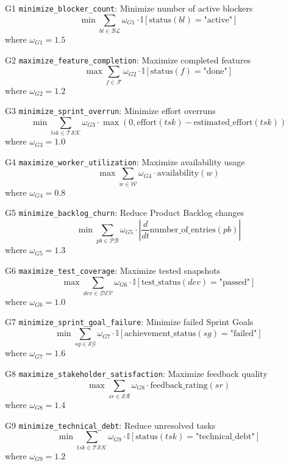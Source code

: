 \documentclass[12pt]{article}
\begin{document}
    \item[G1] \texttt{minimize\_blocker\_count}: Minimize number of active blockers
    \[
    \min \sum_{bl \in \mathcal{BL}} \omega_{G1} \cdot \mathbb{I}[\text{status}(bl) = \text{"active"}]
    \]
    where $ \omega_{G1} = 1.5 $

    \item[G2] \texttt{maximize\_feature\_completion}: Maximize completed features
    \[
    \max \sum_{f \in \mathcal{F}} \omega_{G2} \cdot \mathbb{I}[\text{status}(f) = \text{"done"}]
    \]
    where $ \omega_{G2} = 1.2 $

    \item[G3] \texttt{minimize\_sprint\_overrun}: Minimize effort overruns
    \[
    \min \sum_{tsk \in \mathcal{TSK}} \omega_{G3} \cdot \max\left(0, \text{effort}(tsk) - \text{estimated\_effort}(tsk)\right)
    \]
    where $ \omega_{G3} = 1.0 $

    \item[G4] \texttt{maximize\_worker\_utilization}: Maximize availability usage
    \[
    \max \sum_{w \in \mathcal{W}} \omega_{G4} \cdot \text{availability}(w)
    \]
    where $ \omega_{G4} = 0.8 $

    \item[G5] \texttt{minimize\_backlog\_churn}: Reduce Product Backlog changes
    \[
    \min \sum_{pb \in \mathcal{PB}} \omega_{G5} \cdot \left| \frac{d}{dt} \text{number\_of\_entries}(pb) \right|
    \]
    where $ \omega_{G5} = 1.3 $

    \item[G6] \texttt{maximize\_test\_coverage}: Maximize tested snapshots
    \[
    \max \sum_{dev \in \mathcal{DEV}} \omega_{G6} \cdot \mathbb{I}[\text{test\_status}(dev) = \text{"passed"}]
    \]
    where $ \omega_{G6} = 1.0 $

    \item[G7] \texttt{minimize\_sprint\_goal\_failure}: Minimize failed Sprint Goals
    \[
    \min \sum_{sg \in \mathcal{SG}} \omega_{G7} \cdot \mathbb{I}[\text{achievement\_status}(sg) = \text{"failed"}]
    \]
    where $ \omega_{G7} = 1.6 $

    \item[G8] \texttt{maximize\_stakeholder\_satisfaction}: Maximize feedback quality
    \[
    \max \sum_{sr \in \mathcal{SR}} \omega_{G8} \cdot \text{feedback\_rating}(sr)
    \]
    where $ \omega_{G8} = 1.4 $

    \item[G9] \texttt{minimize\_technical\_debt}: Reduce unresolved tasks
    \[
    \min \sum_{tsk \in \mathcal{TSK}} \omega_{G9} \cdot \mathbb{I}[\text{status}(tsk) = \text{"technical\_debt"}]
    \]
    where $ \omega_{G9} = 1.2 $
\end{document}
